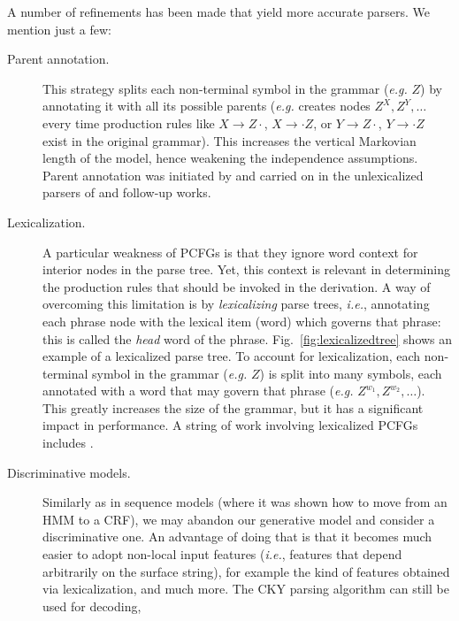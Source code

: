 A number of refinements has been made that yield more accurate parsers. We mention just a few: 
\begin{description}
\item[Parent annotation.] This strategy splits each non-terminal symbol in the grammar (\emph{e.g.} $Z$) by annotating it with all its possible parents 
(\emph{e.g.} creates nodes $Z^X, Z^Y, \ldots$ every time production rules like 
$X \rightarrow Z \cdot$, $X \rightarrow \cdot Z$, or $Y \rightarrow Z \cdot$, $Y \rightarrow \cdot Z$ exist in the original grammar). 
This increases the vertical Markovian length of the model, hence weakening the independence assumptions. Parent annotation was initiated 
by \citet{Johnson1998} and carried on in the unlexicalized parsers of \citet{Klein2003} and follow-up works. \item[Lexicalization.] A particular weakness of PCFGs is that they ignore word context for interior nodes in the parse tree. 
Yet, this context is relevant in determining the production rules that should be invoked in the derivation. A way of overcoming this limitation 
is by \emph{lexicalizing} parse trees, \emph{i.e.}, annotating each phrase node with the lexical item (word) which governs that phrase: this is called the \emph{head} word of 
the phrase. Fig.~\ref{fig:lexicalizedtree} shows an example of a lexicalized parse tree. 
To account for lexicalization, each non-terminal symbol in the grammar (\emph{e.g.} $Z$) is split into many symbols, each annotated with a word that may govern that phrase 
(\emph{e.g.} $Z^{w_1},Z^{w_2},\ldots$).  This greatly increases the size of the grammar, but it has a significant impact in performance. 
A string of work involving lexicalized PCFGs includes \citet{Magerman1995,Charniak1997,Collins1999}. 
\item[Discriminative models.] Similarly as in sequence models (where it was shown how to move from an HMM to a CRF), we may abandon our generative model and 
consider a discriminative one. An advantage of doing that is that it becomes much easier to adopt non-local input features (\emph{i.e.}, features that depend arbitrarily 
on the surface string), for example the kind of features obtained via lexicalization, and much more. The CKY parsing algorithm can still be used for decoding, 

\end{description}
